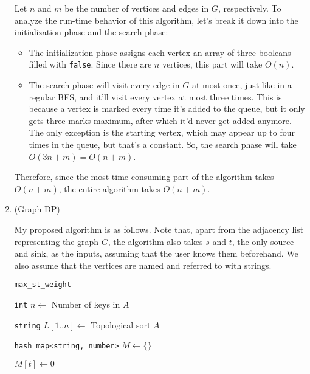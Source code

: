 \documentclass{article}
\begin{document}
\begin{enumerate}
    Let $n$ and $m$ be the number of vertices and edges in $G$, respectively. To analyze the run-time behavior of this algorithm, let's break it down into the initialization phase and the search phase:
    \begin{itemize}
      \item The initialization phase assigns each vertex an array of three booleans filled with \texttt{false}. Since there are $n$ vertices, this part will take $O(n)$.
      \item The search phase will visit every edge in $G$ at most once, just like in a regular BFS, and it'll visit every vertex at most three times. This is because a vertex is marked every time it's added to the queue, but it only gets three marks maximum, after which it'd never get added anymore. The only exception is the starting vertex, which may appear up to four times in the queue, but that's a constant. So, the search phase will take $O(3n + m) = O(n + m)$.
    \end{itemize}

    Therefore, since the most time-consuming part of the algorithm takes $O(n + m)$, the entire algorithm takes $O(n + m)$.

    \pagebreak

  \item (Graph DP)

    My proposed algorithm is as follows. Note that, apart from the adjacency list representing the graph $G$, the algorithm also takes $s$ and $t$, the only source and sink, as the inputs, assuming that the user knows them beforehand. We also assume that the vertices are named and referred to with strings.

    \begin{center}
      \begin{minipage}{\linewidth}
        \renewcommand{\thealgocf}{}
        \begin{algorithm}[H]
          \caption{\texttt{max\_st\_weight}}

          \texttt{int} $n \gets$ Number of keys in $A$

          \texttt{string} $L[1..n] \gets$ Topological sort $A$

          \texttt{hash\_map<string, number>} $M \gets \{\}$

          $M[t] \gets 0$


\end{algorithm}
\end{minipage}
\end{center}
\end{enumerate}
\end{document}
